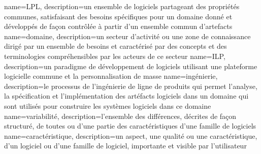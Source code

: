 

{
        name={LPL},
        description={un ensemble de logiciels partageant des propriétés communes, satisfaisant des besoins spécifiques pour un domaine donné et développés de façon contrôlée à partir d'un ensemble commun d’artefacts}
}
{
        name={domaine},
        description={un secteur d'activité ou une zone de connaissance dirigé par un ensemble de besoins et caractérisé par des concepts et des terminologies compréhensibles par les acteurs de ce secteur}
}
{
        name={ILP},
        description={un paradigme de développement de logiciels utilisant une plateforme logicielle commune et la personnalisation de masse}
}
{
        name={ingénierie},
        description={le processus de l'ingénierie de ligne de produits qui permet l'analyse, la spécification et l'implémentation des artéfacts logiciels dans un domaine qui sont utilisés pour construire les systèmes logiciels dans ce domaine}
}
{
        name={variabilité},
        description={l'ensemble des différences, décrites de façon structuré, de toutes ou d'une partie des caractéristiques d'une famille de logiciels}
}
{
        name={caractéristique},
        description={un aspect, une qualité ou une caractéristique, d'un logiciel ou d'une famille de logiciel, importante et visible par l'utilisateur}
}